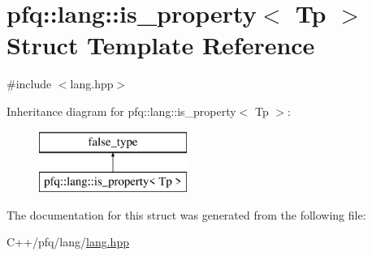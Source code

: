 \hypertarget{structpfq_1_1lang_1_1is__property}{\section{pfq\+:\+:lang\+:\+:is\+\_\+property$<$ Tp $>$ Struct Template Reference}
\label{structpfq_1_1lang_1_1is__property}
}


{\ttfamily \#include $<$lang.\+hpp$>$}

Inheritance diagram for pfq\+:\+:lang\+:\+:is\+\_\+property$<$ Tp $>$\+:\begin{figure}[H]
\begin{center}
\leavevmode
\includegraphics[height=2.000000cm]{structpfq_1_1lang_1_1is__property}
\end{center}
\end{figure}


The documentation for this struct was generated from the following file\+:\begin{DoxyCompactItemize}
\item 
C++/pfq/lang/\hyperlink{lang_8hpp}{lang.\+hpp}\end{DoxyCompactItemize}
